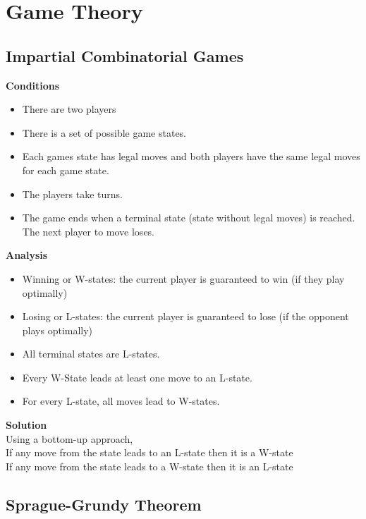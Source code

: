 \section{Game Theory}

\subsection{Impartial Combinatorial Games}

\textbf{Conditions}
\begin{itemize}
\item There are two players
\item There is a set of possible game states.
\item Each games state has legal moves and both players have the same legal moves for each game state.
\item The players take turns.
\item The game ends when a terminal state (state without legal moves) is reached. The next player to move loses.
\end{itemize}

\noindent \textbf{Analysis}
\begin{itemize}
\item Winning or W-states: the current player is guaranteed to win (if they play optimally)
\item Losing or L-states: the current player is guaranteed to lose (if the opponent plays optimally)
\item All terminal states are L-states.
\item Every W-State leads at least one move to an L-state.
\item For every L-state, all moves lead to W-states.
\end{itemize}

\noindent \textbf{Solution} \\
Using a bottom-up approach, \\
If any move from the state leads to an L-state then it is a W-state \\
If any move from the state leads to a W-state then it is an L-state \\


\subsection{Sprague-Grundy Theorem}
